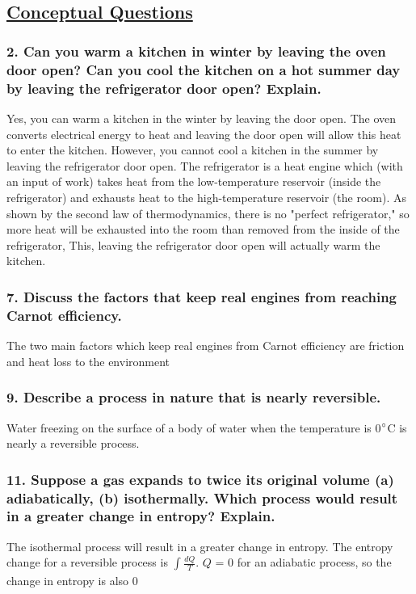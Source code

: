 \documentclass{article}
\title{
    \vspace{2in}
    \textmd{\textbf{\hmwkTitle}}\\
    \vspace{0.5in}
    \textmd{\textbf{\hmwkClass}}\\
    \vspace{4in}
}
\author{\hmwkAuthorName}
\date{}
\begin{document}
\maketitle
\newpage
\begin{center}
    \section*{\textbf{\underline {Conceptual Questions}}}
\end{center}
\subsubsection*{
    2. Can you warm a kitchen in winter by leaving the oven door
    open? Can you cool the kitchen on a hot summer day by
    leaving the refrigerator door open? Explain.
}
Yes, you can warm a kitchen in the winter by leaving the door open. The oven
converts electrical energy to heat and leaving the door open will allow this
heat to enter the kitchen. However, you cannot cool a kitchen in the summer by
leaving the refrigerator door open. The refrigerator is a heat engine which
(with an input of work) takes heat from the low-temperature reservoir (inside
the refrigerator) and exhausts heat to the high-temperature reservoir (the
room). As shown by the second law of thermodynamics, there is no "perfect refrigerator," so
more heat will be exhausted into the room than removed from the inside of the
refrigerator, This, leaving the refrigerator door open will actually warm the
kitchen.
\subsubsection*{
    7. Discuss the factors that keep real engines from
    reaching Carnot efficiency.
}
The two main factors which keep real engines from Carnot efficiency are
friction and heat loss to the environment 
\subsubsection*{
    9. Describe a process in nature that is nearly reversible.
}
Water freezing on the surface of a body of water when the temperature is
0$\degree$C is nearly a reversible process. 
\subsubsection*{
    11. Suppose a gas expands to twice its original volume 
    (\textbf{a}) adiabatically, (\textbf{b}) isothermally. 
    Which process would result in a greater change in entropy? Explain.
}
The isothermal process will result in a greater change in entropy. The entropy
change for a reversible process is $\displaystyle\int_{}^{}
\displaystyle\frac{dQ}{T}$. $Q$ = 0 for an adiabatic process, so the change in
entropy is also 0
\end{document}
